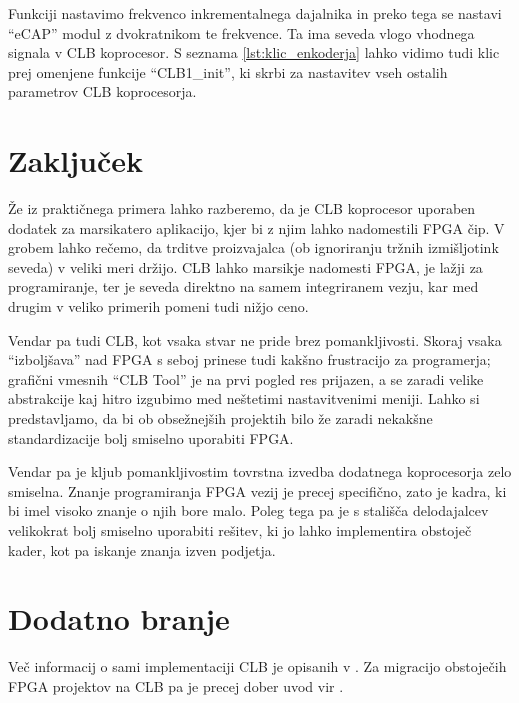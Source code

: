 \documentclass[a4paper]{article}
\begin{document}
Funkciji nastavimo frekvenco inkrementalnega dajalnika in preko tega se nastavi ``eCAP'' modul z dvokratnikom te frekvence. Ta ima seveda vlogo vhodnega signala v CLB koprocesor. S seznama \ref{lst:klic_enkoderja} lahko vidimo tudi klic prej omenjene funkcije ``CLB1\_init'', ki skrbi za nastavitev vseh ostalih parametrov CLB koprocesorja.



\section{Zaključek}
Že iz praktičnega primera lahko razberemo, da je CLB koprocesor uporaben dodatek za marsikatero aplikacijo, kjer bi z njim lahko nadomestili FPGA čip. V grobem lahko rečemo, da trditve proizvajalca (ob ignoriranju tržnih izmišljotink seveda) v veliki meri držijo. CLB lahko marsikje nadomesti FPGA, je lažji za programiranje, ter je seveda direktno na samem integriranem vezju, kar med drugim v veliko primerih pomeni tudi nižjo ceno.

Vendar pa tudi CLB, kot vsaka stvar ne pride brez pomankljivosti. Skoraj vsaka ``izboljšava'' nad FPGA s seboj prinese tudi kakšno frustracijo za programerja; grafični vmesnih ``CLB Tool'' je na prvi pogled res prijazen, a se zaradi velike abstrakcije kaj hitro izgubimo med neštetimi nastavitvenimi meniji. Lahko si predstavljamo, da bi ob obsežnejših projektih bilo že zaradi nekakšne standardizacije bolj smiselno uporabiti FPGA.

Vendar pa je kljub pomankljivostim tovrstna izvedba dodatnega koprocesorja zelo smiselna. Znanje programiranja FPGA vezij je precej specifično, zato je kadra, ki bi imel visoko znanje o njih bore malo. Poleg tega pa je s stališča delodajalcev velikokrat bolj smiselno uporabiti rešitev, ki jo lahko implementira obstoječ kader, kot pa iskanje znanja izven podjetja.

\section{Dodatno branje}
Več informacij o sami implementaciji CLB je opisanih v \cite{clb-designing}. Za migracijo obstoječih FPGA projektov na CLB pa je precej dober uvod vir \cite{fpga-to-clb}.

\printbibliography
\end{document}
